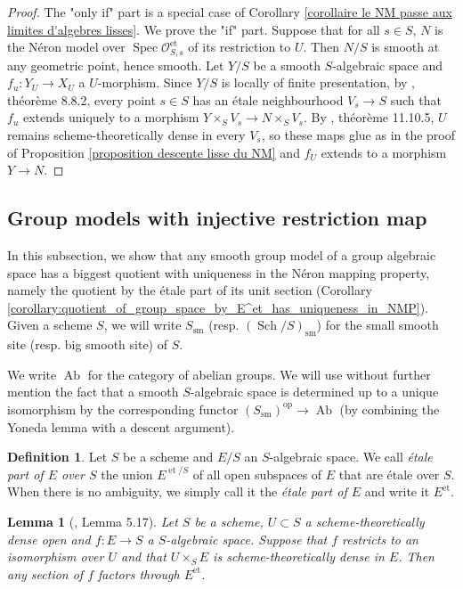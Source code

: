 \documentclass[a4paper,10pt,twoside]{article}
\newcommand{\ra}{\rightarrow}
\newcommand{\on}[1]{\operatorname{#1}}
\renewcommand{\O}{\mathcal{O}}
\DeclareMathOperator{\spec}{Spec}
\DeclareMathOperator{\ab}{Ab}
\newtheorem{lem}[thm]{Lemma}
\theoremstyle{definition}
\newtheorem{defi}[thm]{Definition}
\theoremstyle{remark}
\renewcommand{\on}[1]{\operatorname{#1}}
\newcommand{\sm}[1]{{{#1}_{\operatorname{sm}}}}
\newcommand{\schsm}[1]{{(\operatorname{Sch}/{#1})_{\operatorname{sm}}}}
\begin{document}
\begin{proof}
The "only if" part is a special case of Corollary \ref{corollaire le NM passe aux limites d'algebres lisses}. We prove the "if" part. Suppose that for all $s\in S$, $N$ is the N\'eron model over $\spec\O_{S,s}^{\on{et}}$ of its restriction to $U$. Then $N/S$ is smooth at any geometric point, hence smooth. Let $Y/S$ be a smooth $S$-algebraic space and $f_u\colon Y_U\ra X_U$ a $U$-morphism. Since $Y/S$ is locally of finite presentation, by \cite{EGA4.3}, théorème 8.8.2, every point $s\in S$ has an \'etale neighbourhood $V_s\ra S$ such that $f_u$ extends uniquely to a morphism $Y\times_S V_s\ra N\times_S V_s$. By \cite{EGA4.3}, théorème 11.10.5, $U$ remains scheme-theoretically dense in every $V_s$, so these maps glue as in the proof of Proposition \ref{proposition descente lisse du NM} and $f_U$ extends to a morphism $Y\ra N$.
\end{proof}


\subsection{Group models with injective restriction map}

In this subsection, we show that any smooth group model of a group algebraic space has a biggest quotient with uniqueness in the Néron mapping property, namely the quotient by the étale part of its unit section (Corollary \ref{corollary:quotient_of_group_space_by_E^et_has_uniqueness_in_NMP}). Given a scheme $S$, we will write $\sm S$ (resp. $\schsm S$) for the small smooth site (resp. big smooth site) of $S$.

We write $\ab$ for the category of abelian groups. We will use without further mention the fact that a smooth $S$-algebraic space is determined up to a unique isomorphism by the corresponding functor $(\sm S)^{\on{op}} \to \ab$ (by combining the Yoneda lemma with a descent argument).

\begin{defi}
Let $S$ be a scheme and $E/S$ an $S$-algebraic space. We call \emph{étale part of $E$ over $S$} the union $E^{\on{et}/S}$ of all open subspaces of $E$ that are étale over $S$. When there is no ambiguity, we simply call it the \emph{étale part of $E$} and write it $E^{\on{et}}$.
\end{defi}

\begin{lem}[\cite{Holmes}, Lemma 5.17]\label{lemma:sections_of_E_factor_through_E^et}
Let $S$ be a scheme, $U\subset S$ a scheme-theoretically dense open and $f\colon E \to S$ a $S$-algebraic space. Suppose that $f$ restricts to an isomorphism over $U$ and that $U\times_S E$ is scheme-theoretically dense in $E$. Then any section of $f$ factors through $E^{\on{et}}$.
\end{lem}
\end{document}
